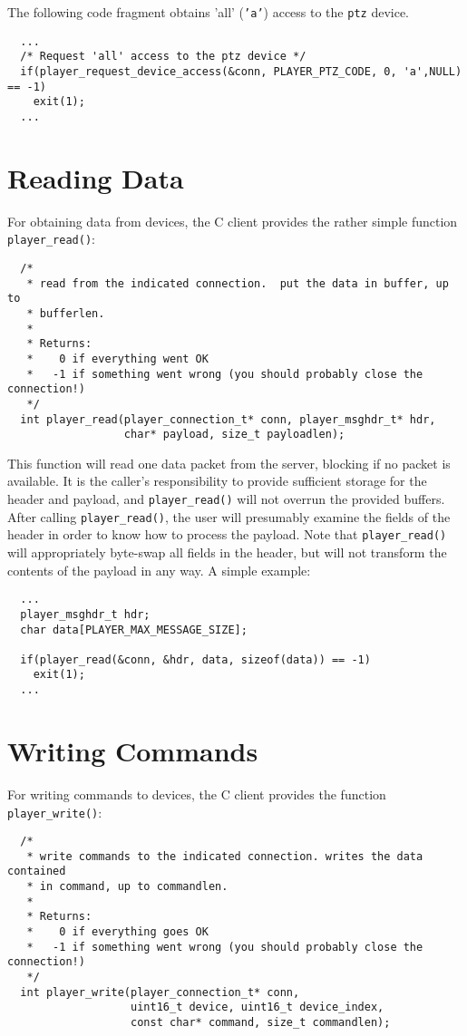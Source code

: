 \documentclass[11pt]{report}
\begin{document}
The following  code fragment obtains 'all' ({\tt 'a'}) access to the 
{\tt ptz} device.

{\small
\begin{verbatim}
  ...
  /* Request 'all' access to the ptz device */
  if(player_request_device_access(&conn, PLAYER_PTZ_CODE, 0, 'a',NULL) == -1)
    exit(1);
  ...
\end{verbatim}
}

\section{Reading Data}
For obtaining data from devices, the C client provides the rather simple 
function {\tt player\_read()}:

{\small
\begin{verbatim}
  /*
   * read from the indicated connection.  put the data in buffer, up to
   * bufferlen.
   *
   * Returns:
   *    0 if everything went OK
   *   -1 if something went wrong (you should probably close the connection!)
   */
  int player_read(player_connection_t* conn, player_msghdr_t* hdr,
                  char* payload, size_t payloadlen);
\end{verbatim}
}

This function will read one data packet from the server, blocking 
if no packet is available.  It is the caller's responsibility to 
provide sufficient storage for the header and payload, and
{\tt player\_read()} will not overrun the provided buffers.  After
calling {\tt player\_read()}, the user will presumably examine the fields
of the header in order to know how to process the payload.  Note that 
{\tt player\_read()} will appropriately byte-swap all fields in the header,
but will not transform the contents of the payload in any way.  A simple
example:

{\small
\begin{verbatim}
  ...
  player_msghdr_t hdr;
  char data[PLAYER_MAX_MESSAGE_SIZE];

  if(player_read(&conn, &hdr, data, sizeof(data)) == -1)
    exit(1);
  ...
\end{verbatim}
}

\section{Writing Commands}
For writing commands to devices, the C client provides the function
{\tt player\_write()}:

{\small
\begin{verbatim}
  /*
   * write commands to the indicated connection. writes the data contained
   * in command, up to commandlen.
   *
   * Returns:
   *    0 if everything goes OK
   *   -1 if something went wrong (you should probably close the connection!)
   */
  int player_write(player_connection_t* conn, 
                   uint16_t device, uint16_t device_index,
                   const char* command, size_t commandlen);
\end{verbatim}
}
\end{document}
